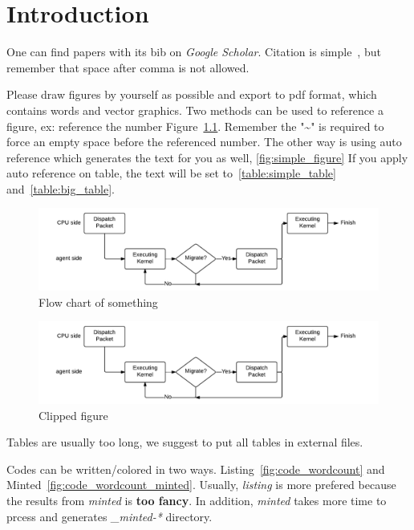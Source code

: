 \chapter{Introduction}
\label{chap:intro}

One can find papers with its bib on \emph{Google Scholar}.
Citation is simple~\cite{yeh2016flattened,intel_ocl_spm}, but remember that space after comma is not allowed.

Please draw figures by yourself as possible and export to pdf format, which contains words and vector graphics.
Two methods can be used to reference a figure, ex: reference the number Figure~\ref{fig:simple_figure}.
Remember the "\textasciitilde" is required to force an empty space before the referenced number.
The other way is using auto reference which generates the text for you as well, \autoref{fig:simple_figure}
If you apply auto reference on table, the text will be set to~\autoref{table:simple_table} and~\autoref{table:big_table}.

\begin{figure}[tbh!]
\centering
\includegraphics[width=0.95\columnwidth]{figures/flowchart}
\caption{Flow chart of something}
\label{fig:simple_figure}
\end{figure}

\begin{figure}[tbh!]
\centering
\includegraphics[width=0.95\columnwidth, trim=5cm 0cm 5cm 2cm, clip=true]{figures/flowchart}
\caption{Clipped figure}
\label{fig:clipped_figure}
\end{figure}

Tables are usually too long, we suggest to put all tables in external files.





Codes can be written/colored in two ways.
Listing~\autoref{fig:code_wordcount} and Minted~\autoref{fig:code_wordcount_minted}.
Usually, \emph{listing} is more prefered because the results from \emph{minted} is \textbf{too fancy}.
In addition, \emph{minted} takes more time to prcess and generates \emph{\_minted-*} directory.


